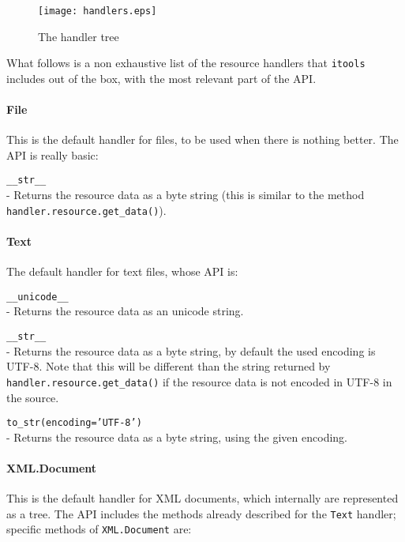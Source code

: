 \begin{figure}
  \center
  \texttt{[image: handlers.eps]}
  \caption{The handler tree}
  \label{Figure: handler tree}
\end{figure}

What follows is a non exhaustive list of the resource handlers that
{\tt itools} includes out of the box, with the most relevant part of the API.

\paragraph{File}

This is the default handler for files, to be used when there is nothing
better. The API is really basic:

\begin{api}
  {\tt \_\_str\_\_}\\
  - Returns the resource data as a byte string (this is similar to the
    method {\tt handler.resource.get\_data()}).
\end{api}

\paragraph{Text}

The default handler for text files, whose API is:

\begin{api}
  {\tt \_\_unicode\_\_}\\
  - Returns the resource data as an unicode string.

  {\tt \_\_str\_\_}\\
  - Returns the resource data as a byte string, by default the used
  encoding is UTF-8. Note that this will be different than the string
  returned by {\tt handler.resource.get\_data()} if the resource data
  is not encoded in UTF-8 in the source.

  {\tt to\_str(encoding='UTF-8')}\\
  - Returns the resource data as a byte string, using the given encoding.
\end{api}

\paragraph{XML.Document}

This is the default handler for XML documents, which internally are
represented as a tree. The API includes the methods already described
for the {\tt Text} handler; specific methods of {\tt XML.Document} are:

